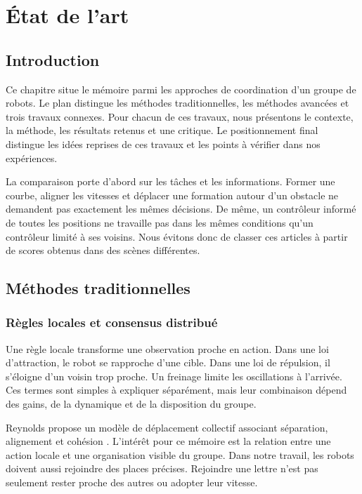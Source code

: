 \chapter{État de l'art}
\label{chap:etatart}

\section{Introduction}
Ce chapitre situe le mémoire parmi les approches de coordination d'un groupe de robots. Le plan distingue les méthodes traditionnelles, les méthodes avancées et trois travaux connexes. Pour chacun de ces travaux, nous présentons le contexte, la méthode, les résultats retenus et une critique. Le positionnement final distingue les idées reprises de ces travaux et les points à vérifier dans nos expériences.

La comparaison porte d'abord sur les tâches et les informations. Former une courbe, aligner les vitesses et déplacer une formation autour d'un obstacle ne demandent pas exactement les mêmes décisions. De même, un contrôleur informé de toutes les positions ne travaille pas dans les mêmes conditions qu'un contrôleur limité à ses voisins. Nous évitons donc de classer ces articles à partir de scores obtenus dans des scènes différentes.

\section{Méthodes traditionnelles}
\subsection{Règles locales et consensus distribué}
Une règle locale transforme une observation proche en action. Dans une loi d'attraction, le robot se rapproche d'une cible. Dans une loi de répulsion, il s'éloigne d'un voisin trop proche. Un freinage limite les oscillations à l'arrivée. Ces termes sont simples à expliquer séparément, mais leur combinaison dépend des gains, de la dynamique et de la disposition du groupe.

Reynolds propose un modèle de déplacement collectif associant séparation, alignement et cohésion \cite{reynolds1987}. L'intérêt pour ce mémoire est la relation entre une action locale et une organisation visible du groupe. Dans notre travail, les robots doivent aussi rejoindre des places précises. Rejoindre une lettre n'est pas seulement rester proche des autres ou adopter leur vitesse.

